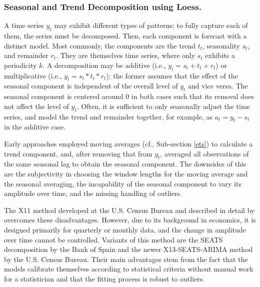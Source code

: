 \subsubsection{Seasonal and Trend Decomposition using Loess.}
\label{stl}

A time series $y_t$ may exhibit different types of patterns; to fully capture
    each of them, the series must be decomposed.
Then, each component is forecast with a distinct model.
Most commonly, the components are the trend $t_t$, seasonality $s_t$, and
    remainder $r_t$.
They are themselves time series, where only $s_t$ exhibits a periodicity $k$.
A decomposition may be additive (i.e., $y_t = s_t + t_t + r_t$) or
    multiplicative (i.e., $y_t = s_t * t_t * r_t$); the former assumes that
    the effect of the seasonal component is independent of the overall level
    of $y_t$ and vice versa.
The seasonal component is centered around $0$ in both cases such that its
    removal does not affect the level of $y_t$.
Often, it is sufficient to only seasonally adjust the time series, and model
    the trend and remainder together, for example, as $a_t = y_t - s_t$ in the
    additive case.

Early approaches employed moving averages (cf., Sub-section \ref{ets}) to
    calculate a trend component, and, after removing that from $y_t$, averaged
    all observations of the same seasonal lag to obtain the seasonal
    component.
The downsides of this are the subjectivity in choosing the window lengths for
    the moving average and the seasonal averaging, the incapability of the
    seasonal component to vary its amplitude over time, and the missing
    handling of outliers.

The X11 method developed at the U.S. Census Bureau and described in detail by
    \cite{dagum2016} overcomes these disadvantages.
However, due to its background in economics, it is designed primarily for
    quarterly or monthly data, and the change in amplitude over time cannot be
    controlled.
Variants of this method are the SEATS decomposition by the Bank of Spain and
    the newer X13-SEATS-ARIMA method by the U.S. Census Bureau.
Their main advantages stem from the fact that the models calibrate themselves
    according to statistical criteria without manual work for a statistician
    and that the fitting process is robust to outliers.

